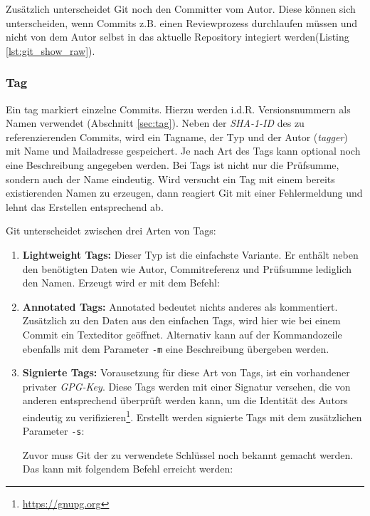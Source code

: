 
Zusätzlich unterscheidet Git noch den Committer vom Autor. Diese können sich
unterscheiden, wenn Commits z.B. einen Reviewprozess durchlaufen müssen und
nicht von dem Autor selbst in das aktuelle Repository integiert werden(Listing
\ref{lst:git_show_raw}).

\subsubsection{Tag}\label{sec:tagobject}
Ein \gls{tag} markiert einzelne Commits. Hierzu werden i.d.R. Versionsnummern
als Namen verwendet (Abschnitt \ref{sec:tag}). Neben
der \textit{SHA-1-ID} des zu referenzierenden Commits, wird ein Tagname, der
Typ und der Autor (\textit{tagger}) mit Name und Mailadresse gespeichert. Je
nach Art des Tags kann optional noch eine Beschreibung angegeben werden. Bei
Tags ist nicht nur die Prüfsumme, sondern auch der Name eindeutig. Wird
versucht ein Tag mit einem bereits existierenden Namen zu erzeugen, dann
reagiert Git mit einer Fehlermeldung und lehnt das Erstellen entsprechend ab.

Git unterscheidet zwischen drei Arten von Tags:

\begin{enumerate}
\item \textbf{Lightweight Tags:} Dieser Typ ist die einfachste Variante. Er
enthält neben den benötigten Daten wie Autor, Commitreferenz und Prüfsumme
lediglich den Namen. Erzeugt wird er mit dem Befehl:


\item \textbf{Annotated Tags:} Annotated bedeutet nichts anderes als
kommentiert. Zusätzlich zu den Daten aus den einfachen Tags, wird hier wie bei
einem Commit ein Texteditor geöffnet. Alternativ kann auf der Kommandozeile
ebenfalls mit dem Parameter \texttt{-m} eine Beschreibung übergeben
werden.


\item \textbf{Signierte Tags:} Vorausetzung für diese Art von Tags, ist ein
vorhandener privater \textit{GPG-Key}. Diese Tags werden mit einer Signatur
versehen, die von anderen entsprechend überprüft werden kann, um die Identität
des Autors eindeutig zu verifizieren\footnote{\url{https://gnupg.org}}.
Erstellt werden signierte Tags mit dem zusätzlichen Parameter \texttt{-s}:


Zuvor muss Git der zu verwendete Schlüssel noch bekannt gemacht werden. Das
kann mit folgendem Befehl erreicht werden:

\end{enumerate}

